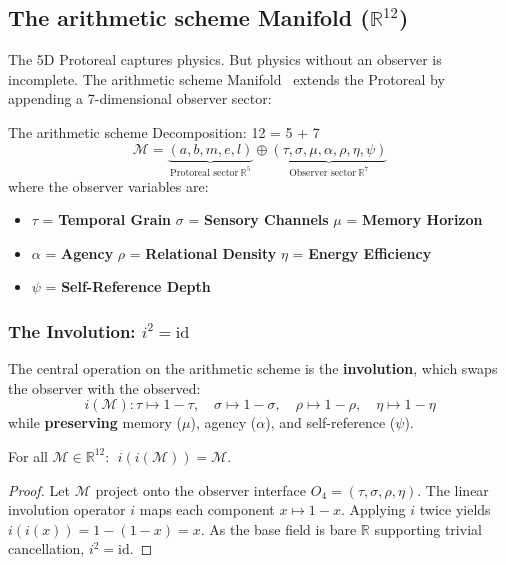 \subsection{The arithmetic scheme Manifold ($\mathbb{R}^{12}$)}

The 5D Protoreal captures physics. But physics without an observer is incomplete. The arithmetic scheme Manifold~\cite{arithmetic schemeManifold} extends the Protoreal by appending a 7-dimensional observer sector:

\begin{arithmetic schemebox}{The arithmetic scheme Decomposition: 12 = 5 + 7}
\begin{equation}
    \mathcal{M} = \underbrace{(a, b, m, e, l)}_{\text{Protoreal sector} \ \mathbb{R}^5} \oplus \underbrace{(\tau, \sigma, \mu, \alpha, \rho, \eta, \psi)}_{\text{Observer sector} \ \mathbb{R}^7}
\end{equation}
where the observer variables are:
\begin{itemize}
    \item $\tau$ = \textbf{Temporal Grain} \quad $\sigma$ = \textbf{Sensory Channels} \quad $\mu$ = \textbf{Memory Horizon}
    \item $\alpha$ = \textbf{Agency} \quad $\rho$ = \textbf{Relational Density} \quad $\eta$ = \textbf{Energy Efficiency}
    \item $\psi$ = \textbf{Self-Reference Depth}
\end{itemize}
\end{arithmetic schemebox}

\subsubsection{The Involution: $i^2 = \mathrm{id}$}

The central operation on the arithmetic scheme is the \textbf{involution}, which swaps the observer with the observed:
\begin{equation}
    i(\mathcal{M}) : \tau \mapsto 1 - \tau, \quad \sigma \mapsto 1 - \sigma, \quad \rho \mapsto 1 - \rho, \quad \eta \mapsto 1 - \eta
\end{equation}
while \textbf{preserving} memory ($\mu$), agency ($\alpha$), and self-reference ($\psi$).

\begin{theorem}
\label{thm:involute}
For all $\mathcal{M} \in \mathbb{R}^{12}$: $\;i(i(\mathcal{M})) = \mathcal{M}$.
\end{theorem}
\begin{proof}
Let $\mathcal{M}$ project onto the observer interface $O_4 = (\tau, \sigma, \rho, \eta)$. The linear involution operator $i$ maps each component $x \mapsto 1 - x$. Applying $i$ twice yields $i(i(x)) = 1 - (1 - x) = x$. As the base field is bare $\mathbb{R}$ supporting trivial cancellation, $i^2 = \mathrm{id}$. \qedhere
\end{proof}

